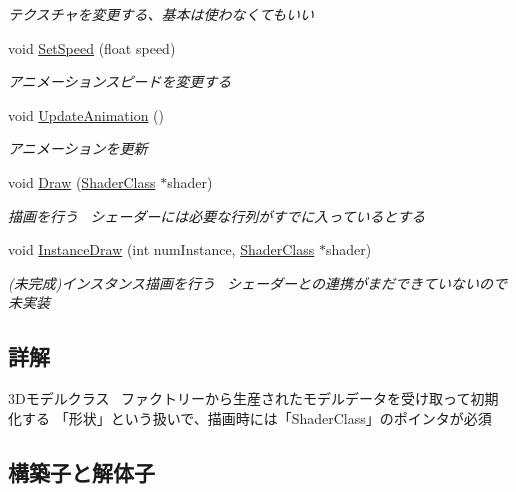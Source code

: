 \begin{DoxyCompactItemize}
\begin{DoxyCompactList}\small\item\em テクスチャを変更する、基本は使わなくてもいい \end{DoxyCompactList}\item 
void \mbox{\hyperlink{class_k___graphics_1_1_mesh_model_a6a691bb67f21e90cfeffe89d02fd2fa2}{Set\+Speed}} (float speed)
\begin{DoxyCompactList}\small\item\em アニメーションスピードを変更する \end{DoxyCompactList}\item 
void \mbox{\hyperlink{class_k___graphics_1_1_mesh_model_abdf4e1efb588647fa962296ac4bbed32}{Update\+Animation}} ()
\begin{DoxyCompactList}\small\item\em アニメーションを更新 \end{DoxyCompactList}\item 
void \mbox{\hyperlink{class_k___graphics_1_1_mesh_model_a2f3e54e2d4edaf4d54744446971447f3}{Draw}} (\mbox{\hyperlink{class_k___graphics_1_1_shader_class}{Shader\+Class}} $\ast$shader)
\begin{DoxyCompactList}\small\item\em 描画を行う~\newline
シェーダーには必要な行列がすでに入っているとする \end{DoxyCompactList}\item 
void \mbox{\hyperlink{class_k___graphics_1_1_mesh_model_ad6da27db2ea78c8b7b531707973d33f1}{Instance\+Draw}} (int num\+Instance, \mbox{\hyperlink{class_k___graphics_1_1_shader_class}{Shader\+Class}} $\ast$shader)
\begin{DoxyCompactList}\small\item\em (未完成)インスタンス描画を行う~\newline
シェーダーとの連携がまだできていないので未実装 \end{DoxyCompactList}\end{DoxyCompactItemize}


\subsection{詳解}
3\+Dモデルクラス~\newline
ファクトリーから生産されたモデルデータを受け取って初期化する 「形状」という扱いで、描画時には「\+Shader\+Class」のポインタが必須 

\subsection{構築子と解体子}
\mbox{\label{class_k___graphics_1_1_mesh_model_ab7ba0ef09b7548369c64fa306a017763}} 
